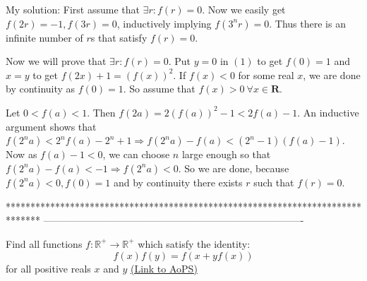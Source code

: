 \begin{mysolution}
	My solution: First assume that $ \exists r: f(r) = 0$. Now we easily get $ f(2r) =-1,f(3r) = 0$, inductively implying $ f(3^{n}r) = 0$. Thus there is an infinite number of $ r$s that satisfy $ f(r) = 0$.

Now we will prove that $ \exists r: f(r) = 0$. Put $ y = 0$ in $ (1)$ to get $ f(0) = 1$ and $ x = y$ to get $ f(2x)+1 = (f(x))^{2}$. If $ f(x) < 0$ for some real $ x$, we are done by continuity as $ f(0) = 1$. So assume that $ f(x) > 0\ \forall x\in\mathbf R$.

Let $ 0 < f(a) < 1$. Then $ f(2a) = 2(f(a))^{2}-1 < 2f(a)-1$. An inductive argument shows that $ f(2^{n}a) < 2^{n}f(a)-2^{n}+1\Longrightarrow f(2^{n}a)-f(a) < (2^{n}-1)(f(a)-1)$. Now as $ f(a)-1 < 0$, we can choose $ n$ large enough so that $ f(2^{n}a)-f(a) <-1\Longrightarrow f(2^{n}a) < 0$. So we are done, because $ f(2^{n}a) < 0, f(0) = 1$ and by continuity there exists $ r$ such that $ f(r) = 0$.
\end{mysolution}
*******************************************************************************
-------------------------------------------------------------------------------

\begin{problem}
	Find all functions $ f: \mathbb{R^+}\to\mathbb{R^+}$   which satisfy the identity:
\[f(x)f(y)=f(x+yf(x))\] for all positive reals $ x$ and $ y$
	\flushright \href{https://artofproblemsolving.com/community/c6h161743}{(Link to AoPS)}
\end{problem}



